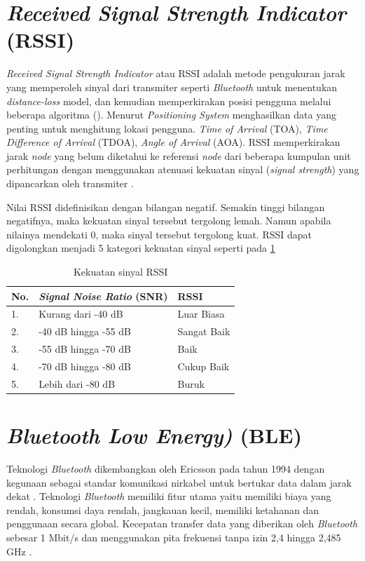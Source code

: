 \section{\textit{Received Signal Strength Indicator} (RSSI)}
\textit{Received Signal Strength Indicator} atau RSSI adalah metode pengukuran jarak yang memperoleh sinyal dari transmiter seperti \textit{Bluetooth} untuk menentukan \textit{distance-loss} model, dan kemudian memperkirakan posisi pengguna melalui beberapa algoritma (\citep{li2018indoor}). Menurut \citep{puspitasari2020} \textit{Positioning System} menghasilkan data yang penting untuk menghitung lokasi pengguna. \textit{Time of Arrival} (TOA), \textit{Time Difference of Arrival} (TDOA), \textit{Angle of Arrival} (AOA). RSSI memperkirakan jarak \textit{node} yang belum diketahui ke referensi \textit{node} dari beberapa kumpulan unit perhitungan dengan menggunakan atenuasi kekuatan sinyal (\textit{signal strength}) yang dipancarkan oleh transmiter \citep{puspitasari2020}.

\par Nilai RSSI didefinisikan dengan bilangan negatif. Semakin tinggi bilangan negatifnya, maka kekuatan sinyal tersebut tergolong lemah. Namun apabila nilainya mendekati 0, maka sinyal tersebut tergolong kuat. RSSI dapat digolongkan menjadi 5 kategori kekuatan sinyal seperti pada \ref{tab:sinyal_rssi}

\begin{table}[]
\caption{Kekuatan sinyal RSSI \citep{sideeq2016smart}}
\label{tab:sinyal_rssi}
\begin{tabular}{|l|l|l|}
\hline
{\color[HTML]{000000} \textbf{No.}} & \textit{\textbf{Signal Noise Ratio }}(SNR) & \textbf{RSSI} \\ \hline
1. & Kurang dari -40 dB   & Luar Biasa  \\ \hline
2. & -40 dB hingga -55 dB & Sangat Baik \\ \hline
3. & -55 dB hingga -70 dB & Baik        \\ \hline
4. & -70 dB hingga -80 dB & Cukup Baik  \\ \hline
5. & Lebih dari -80 dB    & Buruk       \\ \hline
\end{tabular}
\end{table}

\section{\textit{Bluetooth Low Energy)} (BLE)}
Teknologi \textit{Bluetooth} dikembangkan oleh Ericsson pada tahun 1994 dengan kegunaan sebagai standar komunikasi nirkabel untuk bertukar data dalam jarak dekat \citep{kaluvza2017analysis}. Teknologi \textit{Bluetooth} memiliki fitur utama yaitu memiliki biaya yang rendah, konsumsi daya rendah, jangkauan kecil, memiliki ketahanan dan penggunaan secara global. Kecepatan transfer data yang diberikan oleh \textit{Bluetooth} sebesar 1 Mbit/s dan menggunakan pita frekuensi tanpa izin 2,4 hingga 2,485 GHz \citep{kaluvza2017analysis}.


